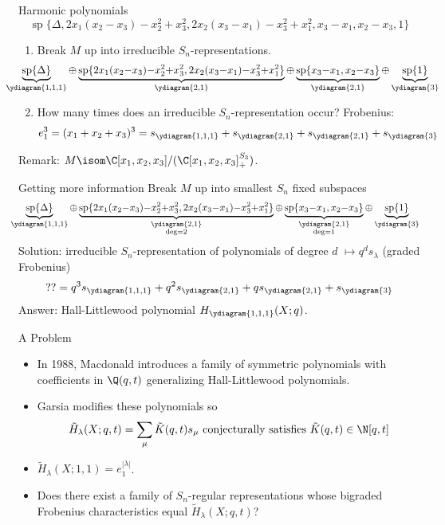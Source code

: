 \documentclass{beamer}
\renewcommand{\Span}{\operatorname{sp}}
\newcounter{c}
\begin{document}
\begin{frame}{Harmonic polynomials}
\[
\Span\{\Delta, 2x_1(x_2-x_3)-x_2^2+x_3^2,
            2x_2(x_3-x_1)-x_3^2+x_1^2, 
       x_3-x_1, x_2-x_3,1\}
  \]\pause 
  \begin{enumerate}
\item Break \(M\) up into irreducible \(S_n\)-representations. \pause
  \[
    \hspace{-2.9em}
    \scalebox{0.95}{\(
      \underbrace{\Span\{\Delta\}}_{\ydiagram{1,1,1}} {\oplus} \underbrace{\Span\{2x_1(x_2{-}x_3){-}x_2^2{+}x_3^2,
        2x_2(x_3{-}x_1){-}x_3^2{+}x_1^2\}}_{\ydiagram{2,1}} {\oplus}
      \underbrace{\Span\{x_3{-}x_1, x_2{-}x_3\}}_{\ydiagram{2,1}} {\oplus} \underbrace{\Span\{1\}}_{\ydiagram{3}}\)}
  \]\pause
  \item How many times does an irreducible \(S_n\)-representation occur? \pause
    Frobenius: \pause
    \[
      e_1^3 = (x_1+x_2+x_3)^3 = s_{\ydiagram{1,1,1}} + s_{\ydiagram{2,1}} +
      s_{\ydiagram{2,1}} + s_{\ydiagram{3}}
    \]
  \end{enumerate}
  \pause
  Remark: \(M \isom \C[x_1,x_2,x_3]/(\C[x_1,x_2,x_3]^{S_3}_+)\).
\end{frame}
\begin{frame}{Getting more information}
  \pause
  Break \(M\) up into smallest \(S_n\) fixed subspaces 
  \[
    \hspace{-0.75em}
    \scalebox{0.95}{\(
      \underbrace{\Span\{\Delta\}}_{\ydiagram{1,1,1}} {\oplus} \underbrace{\Span\{2x_1(x_2{-}x_3){-}x_2^2{+}x_3^2,
        2x_2(x_3{-}x_1){-}x_3^2{+}x_1^2\}}_{\substack{\ydiagram{2,1}\\\deg
        = 2}} {\oplus}
      \underbrace{\Span\{x_3{-}x_1, x_2{-}x_3\}}_{\substack{\ydiagram{2,1}\\\deg=1}} {\oplus} \underbrace{\Span\{1\}}_{\ydiagram{3}}\)}
  \]
  \pause
  Solution: irreducible \(S_n\)-representation of polynomials of degree \(d\) \(\mapsto q^d
  s_\lambda\) (graded Frobenius)\[
    ?? = q^3 s_{\ydiagram{1,1,1}} + q^2 s_{\ydiagram{2,1}} + q
    s_{\ydiagram{2,1}} + s_{\ydiagram{3}}
  \]\pause
  Answer: Hall-Littlewood polynomial \(H_{\ydiagram{1,1,1}}(X;q)\).
\end{frame}
\begin{frame}{A Problem}
  \begin{itemize}
  \item In 1988, Macdonald introduces a family of symmetric
    polynomials with coefficients in \(\Q(q,t)\) generalizing
    Hall-Littlewood polynomials.\pause
  \item Garsia modifies these polynomials so 
    \[
      \tilde{H}_\lambda(X;q,t) = \sum_\mu \tilde{K}(q,t) s_\mu \text{
        conjecturally satisfies }\tilde{K}(q,t) \in \N[q,t]
    \]\pause
  \item \(\tilde{H}_\lambda(X;1,1) = e_1^{|\lambda|}\).\pause
  \item Does there
    exist a family of \(S_n\)-regular representations whose bigraded
    Frobenius characteristics equal \(\tilde{H}_\lambda(X;q,t)\)?
  \end{itemize}
\end{frame}
\end{document}

